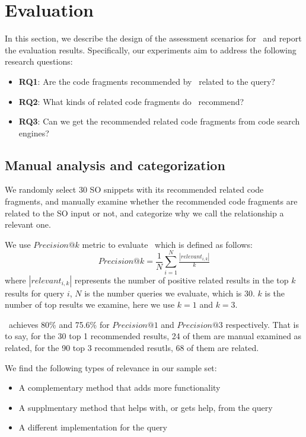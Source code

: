 \section{Evaluation}
\label{sec:eval}


In this section, we describe the design of the assessment scenarios for \tool\ and report the evaluation results. Specifically, our experiments aim to address the following research questions:
\begin{itemize}
	\item \textbf{RQ1}: Are the code fragments recommended by \tool\ related to the query?
	\item \textbf{RQ2}: What kinds of related code fragments do \tool\ recommend?
	\item \textbf{RQ3}: Can we get the recommended related code fragments from code search engines?
\end{itemize}

\subsection{Manual analysis and categorization}
We randomly select 30 SO snippets with its recommended related code fragments, and manually examine whether the recommended code fragments are related to the SO input or not, and categorize why we call the relationship a relevant one.

We use $Precision@k$ metric to evaluate \tool\  which is defined as follows:
\begin{equation}
Precision@k = \frac{1}{N}\sum_{i=1}^{N}\tfrac{\left | relevant_{i,k} \right |}{k}
\end{equation}
where $\left | relevant_{i,k} \right |$ represents the number of positive related results in the top $k$ results for query $i$, $N$ is the number queries we evaluate, which is $30$. $k$ is the number of top results we examine, here we use $k=1$ and $k=3$.

\tool\ achieves 80\% and 75.6\% for $Precision@1$ and $Precision@3$ respectively. That is to say, for the 30 top 1 recommended results, 24 of them are manual examined as related, for the 90 top 3 recommended resutls, 68 of them are related.

We find the following types of relevance in our sample set:
\begin{itemize}
	\item A complementary method that adds more functionality
	\item A supplmentary method that helps with, or gets help, from the query 
	\item A different implementation for the query	
\end{itemize}

